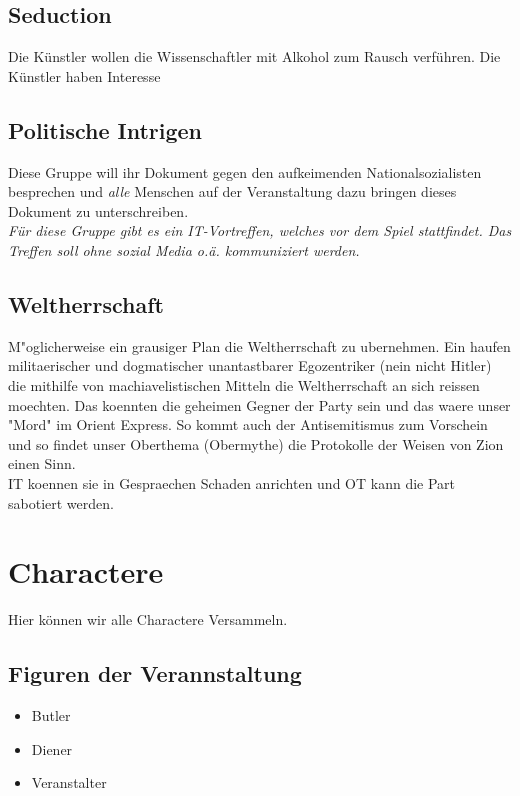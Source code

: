 \documentclass[12pt, a4paper, openany]{report}
\begin{document}
\section{Seduction}
Die Künstler wollen die Wissenschaftler mit Alkohol zum Rausch verführen.
Die Künstler haben Interesse 

\section{Politische Intrigen}
Diese Gruppe will ihr Dokument gegen den aufkeimenden Nationalsozialisten besprechen und \emph{alle} Menschen auf der Veranstaltung dazu bringen dieses Dokument zu unterschreiben.\\

\emph{Für diese Gruppe gibt es ein IT-Vortreffen, welches vor dem Spiel stattfindet.
Das Treffen soll ohne sozial Media o.ä. kommuniziert werden.}

\section{Weltherrschaft}

M"oglicherweise ein grausiger Plan die Weltherrschaft zu ubernehmen. 
Ein haufen militaerischer und dogmatischer unantastbarer Egozentriker (nein nicht Hitler) die mithilfe von machiavelistischen Mitteln die Weltherrschaft an sich reissen moechten. 
Das koennten die geheimen Gegner der Party sein und das waere unser "Mord" im Orient Express. 
So kommt auch der Antisemitismus zum Vorschein und so findet unser Oberthema (Obermythe) die Protokolle der Weisen von Zion einen Sinn.\\
IT koennen sie in Gespraechen Schaden anrichten und OT kann die Part sabotiert werden. 



\chapter{Charactere}
Hier können wir alle Charactere Versammeln.

\section{Figuren der Verannstaltung}
\begin{itemize}
    \item Butler
    \item Diener
    \item Veranstalter
\end{itemize}
\end{document}
